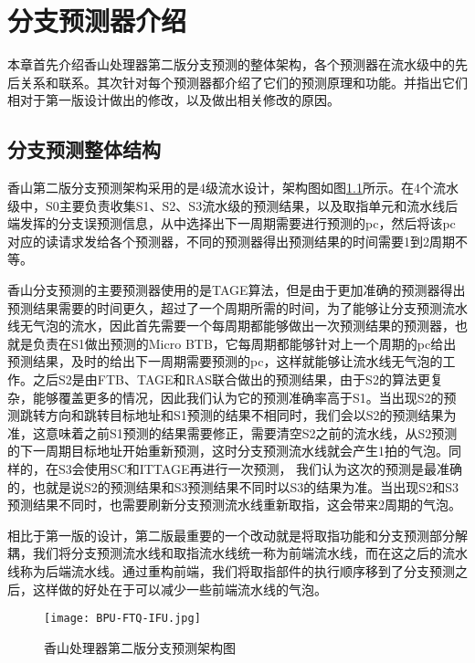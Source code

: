 \chapter{分支预测器介绍}


本章首先介绍香山处理器第二版分支预测的整体架构，各个预测器在流水级中的先后关系和联系。其次针对每个预测器都介绍了它们的预测原理和功能。并指出它们相对于第一版设计做出的修改，以及做出相关修改的原因。

\section{分支预测整体结构}

香山第二版分支预测架构采用的是4级流水设计，架构图如图\ref{fig:figure21}所示。在4个流水级中，S0主要负责收集S1、S2、S3流水级的预测结果，以及取指单元和流水线后端发挥的分支误预测信息，从中选择出下一周期需要进行预测的pc，然后将该pc对应的读请求发给各个预测器，不同的预测器得出预测结果的时间需要1到2周期不等。

香山分支预测的主要预测器使用的是TAGE算法，但是由于更加准确的预测器得出预测结果需要的时间更久，超过了一个周期所需的时间，为了能够让分支预测流水线无气泡的流水，因此首先需要一个每周期都能够做出一次预测结果的预测器，也就是负责在S1做出预测的Micro BTB，它每周期都能够针对上一个周期的pc给出预测结果，及时的给出下一周期需要预测的pc，这样就能够让流水线无气泡的工作。之后S2是由FTB、TAGE和RAS联合做出的预测结果，由于S2的算法更复杂，能够覆盖更多的情况，因此我们认为它的预测准确率高于S1。当出现S2的预测跳转方向和跳转目标地址和S1预测的结果不相同时，我们会以S2的预测结果为准，这意味着之前S1预测的结果需要修正，需要清空S2之前的流水线，从S2预测的下一周期目标地址开始重新预测，这时分支预测流水线就会产生1拍的气泡。同样的，在S3会使用SC和ITTAGE再进行一次预测， 我们认为这次的预测是最准确的，也就是说S2的预测结果和S3预测结果不同时以S3的结果为准。当出现S2和S3预测结果不同时，也需要刷新分支预测流水线重新取指，这会带来2周期的气泡。

相比于第一版的设计，第二版最重要的一个改动就是将取指功能和分支预测部分解耦，我们将分支预测流水线和取指流水线统一称为前端流水线，而在这之后的流水线称为后端流水线。通过重构前端，我们将取指部件的执行顺序移到了分支预测之后，这样做的好处在于可以减少一些前端流水线的气泡。

\begin{figure}[htb]
	\centering
	\setlength\tabcolsep{3pt}  %
	\vspace{5pt} %
	\texttt{[image: BPU-FTQ-IFU.jpg]}
	\caption{香山处理器第二版分支预测架构图}
	\label{fig:figure21}
\end{figure}

